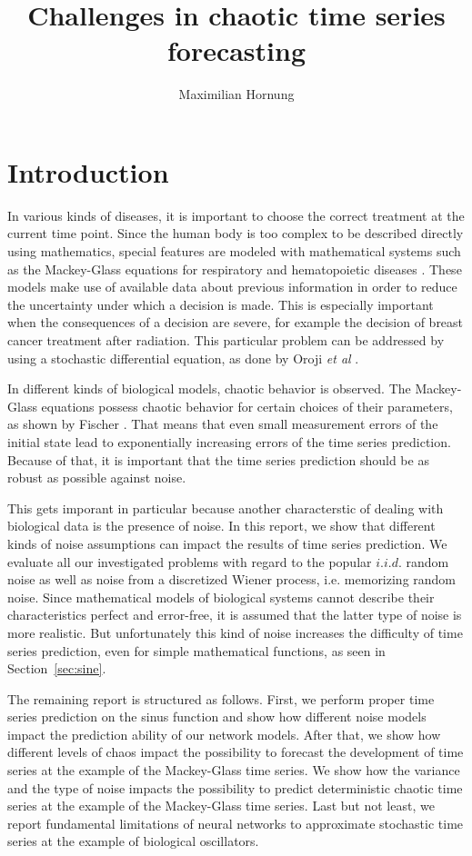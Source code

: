 \documentclass{article}
\title{Challenges in chaotic time series forecasting}
\author{Maximilian Hornung}
\begin{document}
\maketitle



\section{Introduction}

In various kinds of diseases, it is important to choose the correct treatment at
the current time point. Since the human body is too complex to be described
directly using mathematics, special features are modeled with mathematical
systems such as the Mackey-Glass equations for respiratory and hematopoietic
diseases \cite{mackey1977}. These models make use of available data about
previous information in order to reduce the uncertainty under which a decision
is made. This is especially important when the consequences of a decision are
severe, for example the decision of breast cancer treatment after radiation.
This particular problem can be addressed by using a stochastic differential
equation, as done by Oroji \textit{et al} \cite{oroji2016}.

In different kinds of biological models, chaotic behavior is observed. The
Mackey-Glass equations possess chaotic behavior for certain choices of their
parameters, as shown by Fischer \cite{farmer1982}. That means that even small
measurement errors of the initial state lead to exponentially increasing
errors of the time series prediction. Because of that, it is important
that the time series prediction should be as robust as possible against noise.

This gets imporant in particular because another characterstic of dealing with
biological data is the presence of noise. In
this report, we show that different kinds of noise assumptions can impact the
results of time series prediction. We evaluate all our investigated problems
with regard to the popular $i.i.d.$ random noise as well as noise from a
discretized Wiener process, i.e. memorizing random
noise. Since mathematical models of biological systems cannot describe their
characteristics perfect and error-free, it is assumed that the latter type of
noise is more realistic. But unfortunately this kind of noise increases the
difficulty of time series prediction, even for simple mathematical functions,
as seen in Section~\ref{sec:sine}.

The remaining report is structured as follows. First, we perform proper time
series prediction on the sinus function and show how different noise models
impact the prediction ability of our network models. After that, we show how
different levels of chaos impact the possibility to forecast the development
of time series at the example of the Mackey-Glass time series. We show
how the variance and the type
of noise impacts the possibility to predict deterministic
chaotic time series at the example of the Mackey-Glass time series. Last
but not least, we report fundamental limitations of neural networks to
approximate stochastic time series at the example of biological oscillators.
\end{document}
